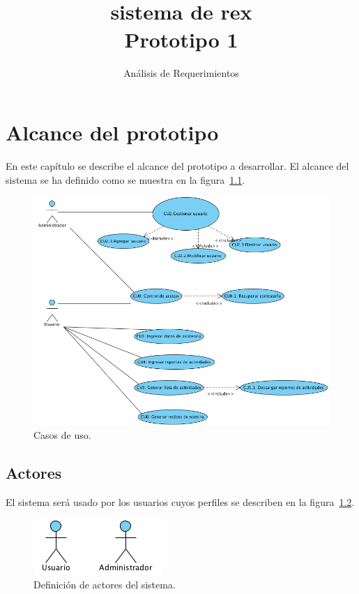 \documentclass[10pt]{book}
\title{\Sistema \\\LARGE{sistema de rex \\{\bf Prototipo 1}}}
\subtitle{Análisis de Requerimientos}
\begin{document}
\maketitle\thispagestyle{empty}

\frontmatter
\tableofcontents

\mainmatter


\chapter{Alcance del prototipo}

	En este capítulo se describe el alcance del prototipo a desarrollar. El alcance del sistema se ha definido como se muestra en la figura~\ref{fig:cu}.
	
\begin{figure}[htbp!]
	\begin{center}
		\includegraphics[width=.5\textwidth]{images/casosDeUso}
		\caption{Casos de uso.}
		\label{fig:cu}
	\end{center}
\end{figure}

\section{Actores}

El sistema será usado por los usuarios cuyos perfiles se describen en la figura~\ref{fig:actores}.

\begin{figure}[htbp!]
	\begin{center}
		\includegraphics[width=.5\textwidth]{images/actores}
		\caption{Definición de actores del sistema.}
		\label{fig:actores}
	\end{center}
\end{figure}
\end{document}
